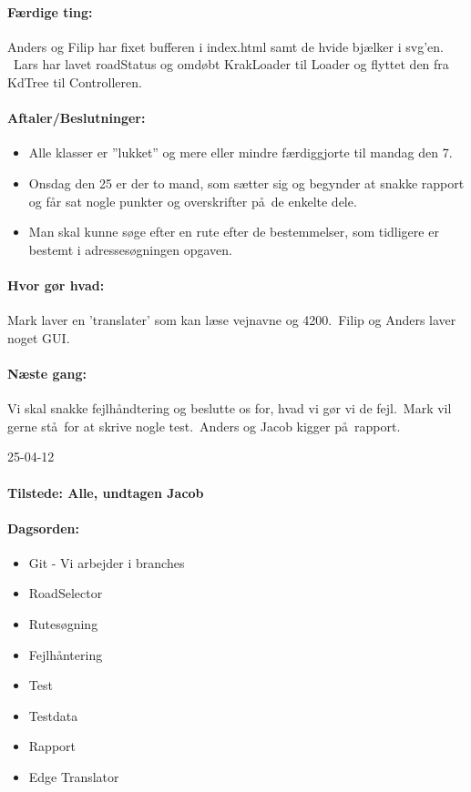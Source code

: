 \documentclass[a4paper,10pt,titlepage]{article}
\begin{document}
		\paragraph{F\ae rdige ting:}
		Anders og Filip har fixet bufferen i index.html samt de hvide bj\ae lker i svg’en. \
Lars har lavet roadStatus og omd\o bt KrakLoader til Loader og flyttet den fra KdTree til Controlleren. 

		\paragraph{Aftaler/Beslutninger:}
		\begin{itemize}
		\item Alle klasser er ”lukket” og mere eller mindre f\ae rdiggjorte til mandag den 7.
\item Onsdag den 25 er der to mand, som s\ae tter sig og begynder at snakke rapport og f\aa r sat nogle punkter og overskrifter p\aa \ de enkelte dele.
\item Man skal kunne s\o ge efter en rute efter de bestemmelser, som tidligere er bestemt i adresses\o gningen opgaven.  
		\end{itemize}
		\paragraph{Hvor g\o r hvad:}
		Mark laver en ’translater’ som kan l\ae se vejnavne og 4200.\
Filip og Anders laver noget GUI.

		\paragraph{N\ae ste gang:}
Vi skal snakke fejlh\aa ndtering og beslutte os for, hvad vi g\o r vi de fejl.\
 Mark vil gerne st\aa \ for at skrive nogle test.\
Anders og Jacob kigger p\aa \ rapport.\mbox{}\\

\begin{center}
		25-04-12
		\end{center}
		
		\paragraph{Tilstede: Alle, undtagen Jacob}
		\paragraph{Dagsorden:}
		\begin{itemize}
					\item Git - Vi arbejder i branches 
					\item RoadSelector
					\item Rutes\o gning
					\item Fejlh\aa ntering
					\item Test
					\item Testdata
					\item Rapport
					\item Edge Translator
		\end{itemize}
		
\end{document}
